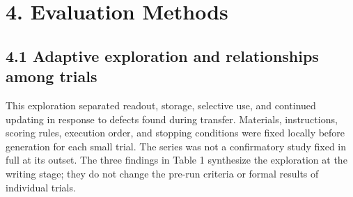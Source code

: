 \documentclass[10pt,a4paper]{article}
\begin{document}
\section{4. Evaluation Methods}\label{paper-02-evaluation-methods}

\subsection{4.1 Adaptive exploration and relationships among trials}\label{paper-02-adaptive-exploration-and-relationships-among-trials}

This exploration separated readout, storage, selective use, and continued updating in response to defects found during transfer. Materials, instructions, scoring rules, execution order, and stopping conditions were fixed locally before generation for each small trial. The series was not a confirmatory study fixed in full at its outset. The three findings in Table 1 synthesize the exploration at the writing stage; they do not change the pre-run criteria or formal results of individual trials.
\end{document}
